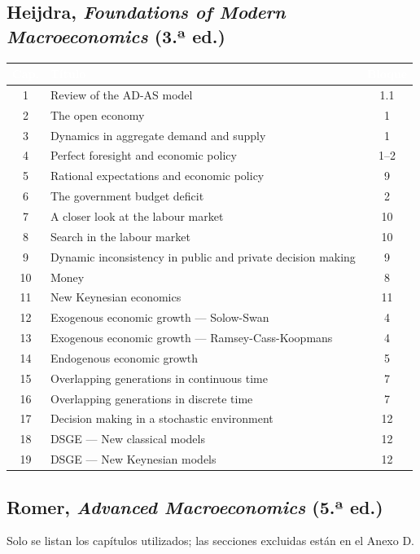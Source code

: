 \documentclass[11pt,a4paper]{article}
\newcommand{\cab}[1]{\textcolor{white}{\sffamily\bfseries #1}}
\newcommand{\filasalternas}{\rowcolors{2}{white}{tonoPalido}}
\begin{document}
\bigskip
\subsection*{Heijdra, \emph{Foundations of Modern Macroeconomics} (3.ª ed.)}
{\filasalternas
\noindent\begin{tabularx}{\textwidth}{cXc}
\toprule
\rowcolor{tonoOscuro}\cab{Cap.} & \cab{Título} & \cab{Bloque} \\
\midrule
1  & Review of the AD-AS model & 1.1 \\
2  & The open economy & 1 \\
3  & Dynamics in aggregate demand and supply & 1 \\
4  & Perfect foresight and economic policy & 1--2 \\
5  & Rational expectations and economic policy & 9 \\
6  & The government budget deficit & 2 \\
7  & A closer look at the labour market & 10 \\
8  & Search in the labour market & 10 \\
9  & Dynamic inconsistency in public and private decision making & 9 \\
10 & Money & 8 \\
11 & New Keynesian economics & 11 \\
12 & Exogenous economic growth --- Solow-Swan & 4 \\
13 & Exogenous economic growth --- Ramsey-Cass-Koopmans & 4 \\
14 & Endogenous economic growth & 5 \\
15 & Overlapping generations in continuous time & 7 \\
16 & Overlapping generations in discrete time & 7 \\
17 & Decision making in a stochastic environment & 12 \\
18 & DSGE --- New classical models & 12 \\
19 & DSGE --- New Keynesian models & 12 \\
\bottomrule
\end{tabularx}
}


\bigskip
\subsection*{Romer, \emph{Advanced Macroeconomics} (5.ª ed.)}
\noindent Solo se listan los capítulos utilizados; las secciones excluidas están
en el Anexo D.
\medskip
\end{document}
